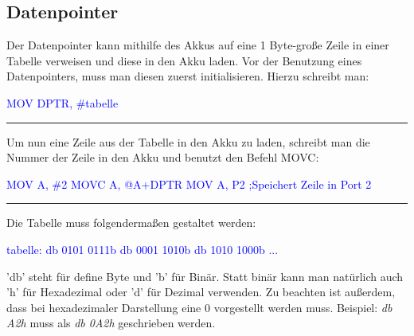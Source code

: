 \documentclass[12pt,a4paper]{article}
\begin{document}
\subsection{Datenpointer}
    \begin{minipage}{.45\textwidth}
        Der Datenpointer kann mithilfe des Akkus auf eine 1 Byte-große Zeile in einer Tabelle verweisen und diese in den Akku laden.
        Vor der Benutzung eines Datenpointers, muss man diesen zuerst initialisieren. Hierzu schreibt man:\newline
    \end{minipage}
    \hspace{1cm}
    \begin{minipage}{.45\textwidth}
        \textcolor{blue}{MOV DPTR, \#tabelle}
    \end{minipage}\newline
    \noindent\rule{\textwidth}{1pt}\vspace{.2cm}\newline
    \begin{minipage}{.45\textwidth}
        Um nun eine Zeile aus der Tabelle in den Akku zu laden, schreibt man die Nummer der Zeile in den Akku und benutzt den Befehl MOVC:\newline
    \end{minipage}
    \hspace{1cm}
    \begin{minipage}{.45\textwidth}
        \textcolor{blue}{MOV A, \#2\newline
        MOVC A, @A+DPTR\newline
        MOV A, P2 ;Speichert Zeile in Port 2}
    \end{minipage}\newline
    \noindent\rule{\textwidth}{1pt}\vspace{.2cm}\newline
    \begin{minipage}{.45\textwidth}
        Die Tabelle muss folgendermaßen gestaltet werden:\newline
    \end{minipage}
    \hspace{1cm}
    \begin{minipage}{.45\textwidth}
        \textcolor{blue}{tabelle:\newline
        db 0101 0111b\newline
        db 0001 1010b\newline
        db 1010 1000b\newline
        ...}\newline
    \end{minipage}
    \noindent'db' steht für define Byte und 'b' für Binär. Statt binär kann man natürlich auch 'h' für Hexadezimal oder 'd' für Dezimal verwenden. Zu beachten ist außerdem, dass bei hexadezimaler Darstellung eine 0 vorgestellt werden muss.\newline
    Beispiel: \textit{db A2h} muss als \textit{db 0A2h} geschrieben werden.
    
\end{document}
